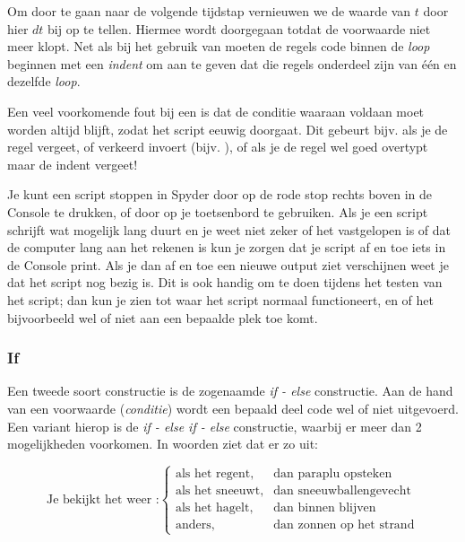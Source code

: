 \documentclass[a4paper,11pt, fleqn]{article}
\begin{document}
Om door te gaan naar de volgende tijdstap vernieuwen we de waarde van $t$ door hier $dt$ bij op te tellen. Hiermee wordt doorgegaan totdat de voorwaarde  niet meer klopt. 
Net als bij het gebruik van  moeten de regels code binnen de  \textit{loop} beginnen met een \textit{indent} om aan te geven dat die regels onderdeel zijn van \'e\'en en dezelfde \textit{loop}.

Een veel voorkomende fout bij een   is dat de conditie waaraan voldaan moet worden altijd  blijft, zodat het script eeuwig doorgaat. Dit gebeurt bijv. als je de regel  vergeet, of verkeerd invoert  (bijv. ), of als je de regel wel goed overtypt maar de indent vergeet!

Je kunt een script stoppen in Spyder door op de rode stop rechts boven in de Console te drukken, of door  op je toetsenbord te gebruiken. Als je een script schrijft wat mogelijk lang duurt en je weet niet zeker of het vastgelopen is of dat de computer lang aan het rekenen is kun je zorgen dat je script af en toe iets in de Console print. Als je dan af en toe een nieuwe output ziet verschijnen weet je dat het script nog bezig is. Dit is ook handig om te doen tijdens het testen van het script; dan kun je zien tot waar het script normaal functioneert, en of het bijvoorbeeld wel of niet aan een bepaalde plek toe komt.

\subsubsection{If}
Een tweede soort constructie is de zogenaamde \textit{if - else} constructie. Aan de hand van een voorwaarde (\textit{conditie}) wordt een bepaald deel code wel of niet uitgevoerd. Een variant hierop is de \textit{if - else if - else} constructie, waarbij er meer dan 2 mogelijkheden voorkomen. In woorden ziet dat er zo uit:

\begin{equation}
\text{Je bekijkt het weer :} \left\{ \begin{matrix}\text{als het regent,} & \text{dan paraplu opsteken} \\ 
											\text{als het sneeuwt,} & \text{dan sneeuwballengevecht} \\ 
											\text{als het hagelt,} & \text{dan binnen blijven} \\
											\text{anders,} & \text{dan zonnen op het strand}
							  \end{matrix}\right.
\end{equation}
\end{document}
